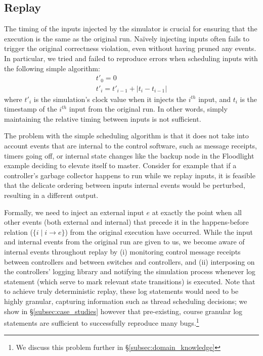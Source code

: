 \subsection{Replay}
\label{subsec:replay}

The timing of the inputs injected by the simulator is crucial for ensuring that the
execution is the same as the original run. Na\"ively injecting inputs often fails to
trigger the original correctness violation, even without having pruned any
events. In particular, we tried and failed to reproduce errors when scheduling inputs
with the following simple algorithm:
\begin{align*}
t'_0 = 0 \\
t'_i = t'_{i-1} + |t_{i} - t_{i-1}|
\end{align*}
where $t'_i$ is the simulation's clock value when it injects the $i^{th}$ input, and $t_i$ is
the timestamp of the $i^{th}$ input from the original run. In other words, simply
maintaining the relative timing between inputs is not sufficient.

The problem with the simple scheduling algorithm is that it does not take into
account events that are internal to the control software, such as
message receipts, timers going off, or internal state
changes like the backup node in the Floodlight example deciding to elevate itself to master.
Consider for example that if a controller's garbage collector happens to run
while we replay inputs, it is feasible that the delicate ordering between
inputs internal events would be perturbed, resulting in a different output.

Formally, we need to inject an external input $e$ at exactly the point when all other
events (both external and internal) that precede it in the happens-before
relation ($\{i \mid i \rightarrow e\}$) from the original execution have occurred.
While the input and internal events from the original run are given to us,
we become aware of internal events throughout replay by
(i) monitoring
control message receipts between controllers and between switches and
controllers, and (ii) interposing on the controllers' logging library and notifying the
simulation process whenever log statement (which serve to mark relevant state
transitions) is executed. Note that to achieve truly deterministic
replay, these log statements would need to
be highly granular, capturing information such as thread scheduling decisions;
we show in \S\ref{subsec:case_studies}
however that pre-existing, course granular log statements are sufficient to
successfully reproduce many bugs.\footnote{We discuss this problem further in \S\ref{subsec:domain_knowledge}}

